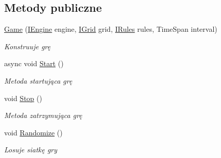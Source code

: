 \subsection*{Metody publiczne}
\begin{DoxyCompactItemize}
\item 
\hyperlink{class_convay_1_1_core_1_1_game_a6a97d86b561918a025ea1df73c86eee0}{Game} (\hyperlink{interface_convay_1_1_core_1_1_interfaces_1_1_i_engine}{I\+Engine} engine, \hyperlink{interface_convay_1_1_core_1_1_interfaces_1_1_i_grid}{I\+Grid} grid, \hyperlink{interface_convay_1_1_core_1_1_interfaces_1_1_i_rules}{I\+Rules} rules, Time\+Span interval)
\begin{DoxyCompactList}\small\item\em Konstruuje grę \end{DoxyCompactList}\item 
async void \hyperlink{class_convay_1_1_core_1_1_game_a34947ec8157eabc9eba8d5d8fd116f42}{Start} ()
\begin{DoxyCompactList}\small\item\em Metoda startująca grę \end{DoxyCompactList}\item 
void \hyperlink{class_convay_1_1_core_1_1_game_a1f0547dcd642f826756cb94f0a6f907f}{Stop} ()
\begin{DoxyCompactList}\small\item\em Metoda zatrzymująca grę \end{DoxyCompactList}\item 
void \hyperlink{class_convay_1_1_core_1_1_game_a59b58207976ef30b82932d1196806c8f}{Randomize} ()
\begin{DoxyCompactList}\small\item\em Losuje siatkę gry \end{DoxyCompactList}\end{DoxyCompactItemize}
